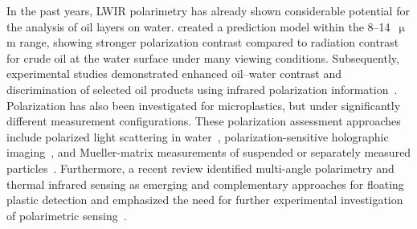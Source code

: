 \documentclass[pdflatex,sn-apa]{sn-jnl}
\begin{document}
In the past years, LWIR polarimetry has already shown considerable potential for the analysis of oil layers on water. \citet{Zhang2014} created a prediction model within the 8--14~$\upmu$m range, showing stronger polarization contrast compared to radiation contrast for crude oil at the water surface under many viewing conditions. Subsequently, experimental studies demonstrated enhanced oil--water contrast and discrimination of selected oil products using infrared polarization information~\citep{Chenault2018,Fu2022,Sun2023}. Polarization has also been investigated for microplastics, but under significantly different measurement configurations. These polarization assessment approaches include polarized light scattering in water~\citep{Liu2021,Liu2024}, polarization-sensitive holographic imaging~\citep{Valentino2022}, and Mueller-matrix measurements of suspended or separately measured particles~\citep{Li2023,Yang2026}. Furthermore, a recent review identified multi-angle polarimetry and thermal infrared sensing as emerging and complementary approaches for floating plastic detection and emphasized the need for further experimental investigation of polarimetric sensing~\citep{GoddijnMurphy2024}.

\end{document}
